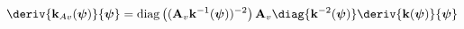 \begin{equation}
\label{eq:mass-matrix-kav-deriv}
\deriv{\mathbf{k}_{Av}(\boldsymbol{\psi})}{\boldsymbol{\psi}}
=
{\rm diag}\left(
    (\mathbf{A}_v \mathbf{k}^{-1}(\boldsymbol{\psi}))^{-2} \right)
\mathbf{A}_v
\diag{
    \mathbf{k}^{-2}(\boldsymbol{\psi}) }
\deriv{\mathbf{k}(\boldsymbol{\psi})}{\boldsymbol{\psi}}
\end{equation}
